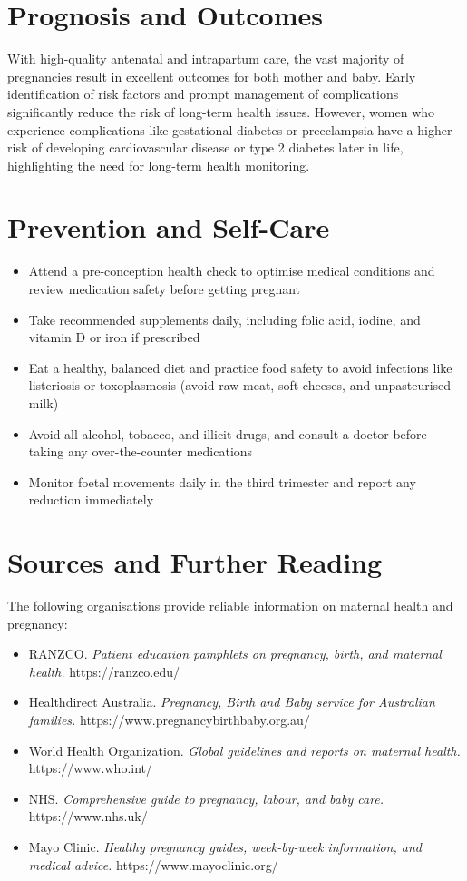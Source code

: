 \section*{Prognosis and Outcomes}
With high-quality antenatal and intrapartum care, the vast majority of pregnancies result in excellent outcomes for both mother and baby. Early identification of risk factors and prompt management of complications significantly reduce the risk of long-term health issues. However, women who experience complications like gestational diabetes or preeclampsia have a higher risk of developing cardiovascular disease or type 2 diabetes later in life, highlighting the need for long-term health monitoring.

\section*{Prevention and Self-Care}
\begin{itemize}
    \item Attend a pre-conception health check to optimise medical conditions and review medication safety before getting pregnant
    \item Take recommended supplements daily, including folic acid, iodine, and vitamin D or iron if prescribed
    \item Eat a healthy, balanced diet and practice food safety to avoid infections like listeriosis or toxoplasmosis (avoid raw meat, soft cheeses, and unpasteurised milk)
    \item Avoid all alcohol, tobacco, and illicit drugs, and consult a doctor before taking any over-the-counter medications
    \item Monitor foetal movements daily in the third trimester and report any reduction immediately
\end{itemize}

\section*{Sources and Further Reading}
The following organisations provide reliable information on maternal health and pregnancy:

\begin{itemize}
    \item RANZCO. \textit{Patient education pamphlets on pregnancy, birth, and maternal health.} https://ranzco.edu/
    \item Healthdirect Australia. \textit{Pregnancy, Birth and Baby service for Australian families.} https://www.pregnancybirthbaby.org.au/
    \item World Health Organization. \textit{Global guidelines and reports on maternal health.} https://www.who.int/
    \item NHS. \textit{Comprehensive guide to pregnancy, labour, and baby care.} https://www.nhs.uk/
    \item Mayo Clinic. \textit{Healthy pregnancy guides, week-by-week information, and medical advice.} https://www.mayoclinic.org/
\end{itemize}
